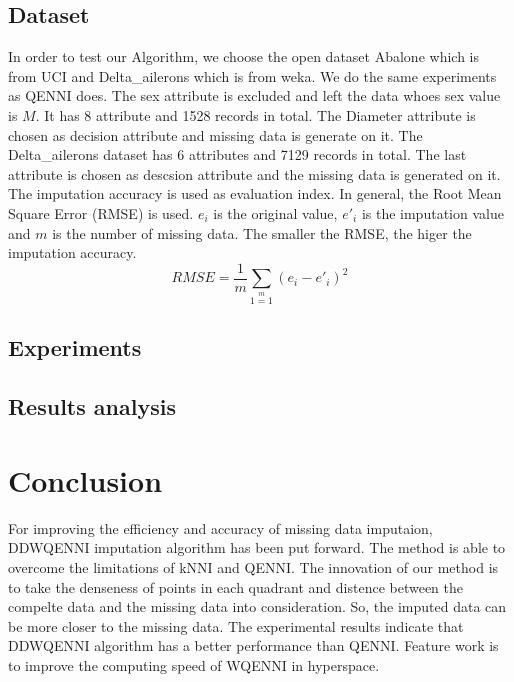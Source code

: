 \documentclass[print]{jicspack}
\begin{document}
\subsection{Dataset}
\label{sec:1.1}
In order to test our Algorithm, we choose the open dataset Abalone which is from UCI and Delta\_ailerons which is from weka. We do the same experiments as QENNI does. The sex attribute is excluded and left the data whoes sex value is $M$. It has 8 attribute and 1528 records in total. The Diameter attribute is chosen as decision attribute and missing data is generate on it. The Delta\_ailerons dataset has 6 attributes and 7129 records in total. The last attribute is chosen as descsion attribute and the missing data is generated on it. The imputation accuracy is used as evaluation index. In general, the Root Mean Square Error (RMSE) is used. $e_i$ is the original value, $e'_i$ is the imputation value and $m$ is the number of missing data. The smaller the RMSE, the higer the imputation accuracy.
\begin{equation}
\label{eq:6}
RMSE = \frac{1}{m}\sum\limits_{1=1}\limits^{m}(e_i - e'_i)^2
\end{equation}

\subsection{Experiments}

\subsection{Results analysis}


\section{Conclusion}
For improving the efficiency and accuracy of missing data imputaion, DDWQENNI imputation algorithm has been put forward. The method is able to overcome the limitations of kNNI and QENNI. The innovation of our method is to take the denseness of points in each quadrant and distence between the compelte data and the missing data into consideration. So, the imputed data can be more closer to the missing data. The experimental results indicate that DDWQENNI algorithm has a better performance than QENNI. Feature work is to improve the computing speed of WQENNI in hyperspace.
\end{document}
